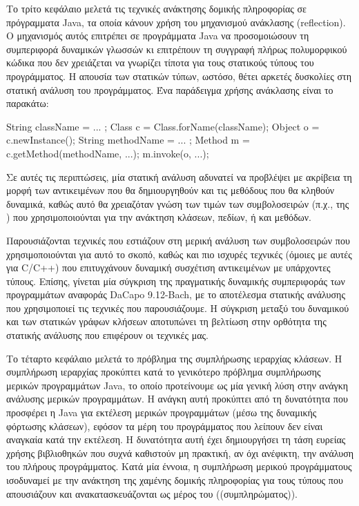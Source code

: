 Το τρίτο κεφάλαιο μελετά τις τεχνικές ανάκτησης δομικής πληροφορίας σε
πρόγραμματα {\en Java}, τα οποία κάνουν χρήση του μηχανισμού ανάκλασης
({\en reflection}).  Ο μηχανισμός αυτός επιτρέπει σε προγράμματα {\en
  Java} να προσομοιώσουν τη συμπεριφορά δυναμικών γλωσσών κι
επιτρέπουν τη συγγραφή πλήρως πολυμορφικού κώδικα που δεν χρειάζεται
να γνωρίζει τίποτα για τους στατικούς τύπους του προγράμματος. Η
απουσία των στατικών τύπων, ωστόσο, θέτει αρκετές δυσκολίες στη
στατική ανάλυση του προγράμματος. Ένα παράδειγμα χρήσης ανάκλασης
είναι το παρακάτω:
{\en
  \begin{javacodelinum}
    String className = ... ;
    Class c = Class.forName(className);
    Object o = c.newInstance();
    String methodName = ... ;
    Method m = c.getMethod(methodName, ...);
    m.invoke(o, ...);
  \end{javacodelinum}
}

Σε αυτές τις περιπτώσεις, μία στατική ανάλυση αδυνατεί να προβλέψει με
ακρίβεια τη μορφή των αντικειμένων που θα δημιουργηθούν και τις μεθόδους
που θα κληθούν δυναμικά, καθώς αυτό θα χρειαζόταν γνώση των τιμών των
συμβολοσειρών (π.χ., της {\en {}}) που χρησιμοποιούνται
για την ανάκτηση κλάσεων, πεδίων, ή και μεθόδων.

Παρουσιάζονται τεχνικές που εστιάζουν στη μερική ανάλυση των
συμβολοσειρών που χρησιμοποιούνται για αυτό το σκοπό, καθώς και πιο
ισχυρές τεχνικές (όμοιες με αυτές για {\en C/C++}) που επιτυγχάνουν
δυναμική συσχέτιση αντικειμένων με υπάρχοντες τύπους.
%
Επίσης, γίνεται μία σύγκριση της πραγματικής δυναμικής συμπεριφοράς
των προγραμμάτων αναφοράς {\en DaCapo 9.12-Bach}, με το αποτέλεσμα
στατικής ανάλυσης που χρησιμοποιεί τις τεχνικές που παρουσιάζουμε. Η
σύγκριση μεταξύ του δυναμικού και των στατικών γράφων κλήσεων
αποτυπώνει τη βελτίωση στην ορθότητα της στατικής ανάλυσης που
επιφέρουν οι τεχνικές μας.



Το τέταρτο κεφάλαιο μελετά το πρόβλημα της συμπλήρωσης ιεραρχίας
κλάσεων. Η συμπλήρωση ιεραρχίας προκύπτει κατά το γενικότερο πρόβλημα
συμπλήρωσης μερικών προγραμμάτων {\en Java}, το οποίο προτείνουμε ως
μία γενική λύση στην ανάγκη ανάλυσης μερικών προγραμμάτων. Η ανάγκη
αυτή προκύπτει από τη δυνατότητα που προσφέρει η {\en Java} για
εκτέλεση μερικών προγραμμάτων (μέσω της δυναμικής φόρτωσης κλάσεων),
εφόσον τα μέρη του προγράμματος που λείπουν δεν είναι αναγκαία κατά
την εκτέλεση. Η δυνατότητα αυτή έχει δημιουργήσει τη τάση ευρείας
χρήσης βιβλιοθηκών που συχνά καθιστούν μη πρακτική, αν όχι ανέφικτη,
την ανάλυση του πλήρους προγράμματος. Κατά μία έννοια, η συμπλήρωση
μερικού προγράμματους ισοδυναμεί με την ανάκτηση της χαμένης δομικής
πληροφορίας για τους τύπους που απουσιάζουν και ανακατασκευάζονται ως
μέρος του ((συμπληρώματος)).

